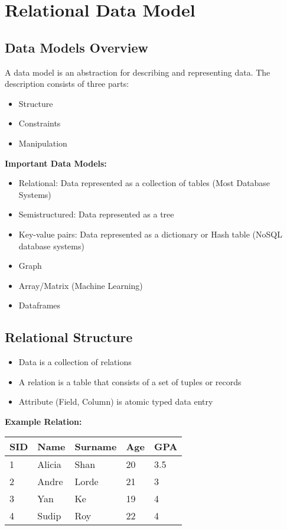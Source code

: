 \documentclass{article}
\begin{document}
\section*{Relational Data Model}

\subsection*{Data Models Overview}
A data model is an abstraction for describing and representing data. The description consists of three parts:
\begin{itemize}
    \item Structure
    \item Constraints
    \item Manipulation
\end{itemize}

\textbf{Important Data Models:}
\begin{itemize}
    \item Relational: Data represented as a collection of tables (Most Database Systems)
    \item Semistructured: Data represented as a tree
    \item Key-value pairs: Data represented as a dictionary or Hash table (NoSQL database systems)
    \item Graph
    \item Array/Matrix (Machine Learning)
    \item Dataframes
\end{itemize}

\subsection*{Relational Structure}
\begin{itemize}
    \item Data is a collection of relations
    \item A relation is a table that consists of a set of tuples or records
    \item Attribute (Field, Column) is atomic typed data entry
\end{itemize}

\textbf{Example Relation:}
\begin{tabular}{lllll}
\hline
SID & Name & Surname & Age & GPA \\
\hline
1 & Alicia & Shan & 20 & 3.5 \\
2 & Andre & Lorde & 21 & 3 \\
3 & Yan & Ke & 19 & 4 \\
4 & Sudip & Roy & 22 & 4 \\
\hline
\end{tabular}
\end{document}
